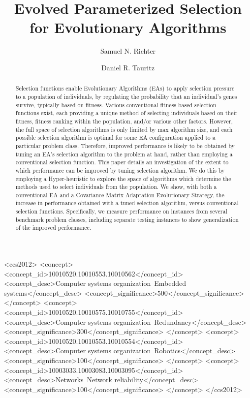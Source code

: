 \documentclass[sigconf]{acmart}
\begin{document}
\title[Evolved Parameterized Selection for Evolutionary Algorithms]{Evolved Parameterized Selection for Evolutionary Algorithms}

\author{Samuel N. Richter}

\author{Daniel R. Tauritz}


\begin{abstract}
Selection functions enable Evolutionary Algorithms (EAs) to apply selection pressure to a population of individuals, by regulating the probability that an individual's genes survive, typically based on fitness. Various conventional fitness based selection functions exist, each providing a unique method of selecting individuals based on their fitness, fitness ranking within the population, and/or various other factors. However, the full space of selection algorithms is only limited by max algorithm size, and each possible selection algorithm is optimal for some EA configuration applied to a particular problem class. Therefore, improved performance is likely to be obtained by tuning an EA's selection algorithm to the problem at hand, rather than employing a conventional selection function. This paper details an investigation of the extent to which performance can be improved by tuning selection algorithm. We do this by employing a Hyper-heuristic to explore the space of algorithms which determine the methods used to select individuals from the population. We show, with both a conventional EA and a Covariance Matrix Adaptation Evolutionary Strategy, the increase in performance obtained with a tuned selection algorithm, versus conventional selection functions. Specifically, we measure performance on instances from several benchmark problem classes, including separate testing instances to show generalization of the improved performance.

\end{abstract}

%
%
\begin{CCSXML}
<ccs2012>
 <concept>
  <concept_id>10010520.10010553.10010562</concept_id>
  <concept_desc>Computer systems organization~Embedded systems</concept_desc>
  <concept_significance>500</concept_significance>
 </concept>
 <concept>
  <concept_id>10010520.10010575.10010755</concept_id>
  <concept_desc>Computer systems organization~Redundancy</concept_desc>
  <concept_significance>300</concept_significance>
 </concept>
 <concept>
  <concept_id>10010520.10010553.10010554</concept_id>
  <concept_desc>Computer systems organization~Robotics</concept_desc>
  <concept_significance>100</concept_significance>
 </concept>
 <concept>
  <concept_id>10003033.10003083.10003095</concept_id>
  <concept_desc>Networks~Network reliability</concept_desc>
  <concept_significance>100</concept_significance>
 </concept>
</ccs2012>  
\end{CCSXML}
\end{document}
